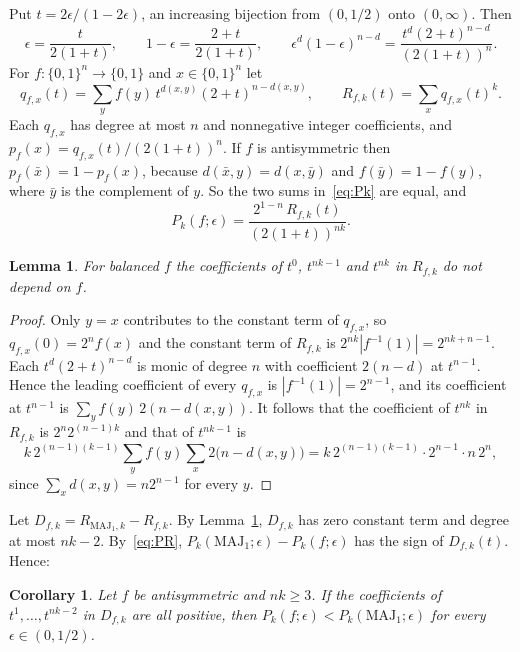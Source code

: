 \documentclass[11pt]{amsart}
\newtheorem{lemma}[theorem]{Lemma}
\newtheorem{corollary}[theorem]{Corollary}
\theoremstyle{remark}
\newcommand{\MAJ}{\mathrm{MAJ}}
\begin{document}
Put $t=2\epsilon/(1-2\epsilon)$, an increasing bijection from $(0,1/2)$ onto $(0,\infty)$. Then
\[
  \epsilon=\frac{t}{2(1+t)},\qquad 1-\epsilon=\frac{2+t}{2(1+t)},\qquad
  \epsilon^{d}(1-\epsilon)^{n-d}=\frac{t^{d}(2+t)^{n-d}}{(2(1+t))^{n}} .
\]
For $f\colon\{0,1\}^n\to\{0,1\}$ and $x\in\{0,1\}^n$ let
\[
  q_{f,x}(t)=\sum_{y}f(y)\,t^{d(x,y)}(2+t)^{n-d(x,y)},\qquad R_{f,k}(t)=\sum_{x}q_{f,x}(t)^k .
\]
Each $q_{f,x}$ has degree at most $n$ and nonnegative integer coefficients, and $p_f(x)=q_{f,x}(t)/(2(1+t))^n$. If $f$
is antisymmetric then $p_f(\bar x)=1-p_f(x)$, because $d(\bar x,y)=d(x,\bar y)$ and $f(\bar y)=1-f(y)$, where $\bar y$ is the complement of $y$. So the two
sums in~\eqref{eq:Pk} are equal, and
\begin{equation}\label{eq:PR}
  P_k(f;\epsilon)=\frac{2^{1-n}\,R_{f,k}(t)}{(2(1+t))^{nk}} .
\end{equation}

\begin{lemma}\label{lem:ends}
For balanced $f$ the coefficients of $t^0$, $t^{nk-1}$ and $t^{nk}$ in $R_{f,k}$ do not depend on $f$.
\end{lemma}

\begin{proof}
Only $y=x$ contributes to the constant term of $q_{f,x}$, so $q_{f,x}(0)=2^nf(x)$ and the constant term of $R_{f,k}$
is $2^{nk}|f^{-1}(1)|=2^{nk+n-1}$. Each $t^{d}(2+t)^{n-d}$ is monic of degree $n$ with coefficient $2(n-d)$ at
$t^{n-1}$. Hence the leading coefficient of every $q_{f,x}$ is $|f^{-1}(1)|=2^{n-1}$, and its coefficient at $t^{n-1}$
is $\sum_y f(y)\,2(n-d(x,y))$. It follows that the coefficient of $t^{nk}$ in $R_{f,k}$ is $2^n2^{(n-1)k}$ and that
of $t^{nk-1}$ is
\[
  k\,2^{(n-1)(k-1)}\sum_{y}f(y)\sum_{x}2\bigl(n-d(x,y)\bigr)=k\,2^{(n-1)(k-1)}\cdot2^{n-1}\cdot n\,2^{n},
\]
since $\sum_x d(x,y)=n2^{n-1}$ for every $y$.
\end{proof}

Let $D_{f,k}=R_{\MAJ_1,k}-R_{f,k}$. By Lemma~\ref{lem:ends}, $D_{f,k}$ has zero constant term and degree at most
$nk-2$. By~\eqref{eq:PR}, $P_k(\MAJ_1;\epsilon)-P_k(f;\epsilon)$ has the sign of $D_{f,k}(t)$. Hence:

\begin{corollary}\label{cor:coef}
Let $f$ be antisymmetric and $nk\ge3$. If the coefficients of $t^1,\dots,t^{nk-2}$ in $D_{f,k}$ are all
positive, then
$P_k(f;\epsilon)<P_k(\MAJ_1;\epsilon)$ for every $\epsilon\in(0,1/2)$.
\end{corollary}
\end{document}
